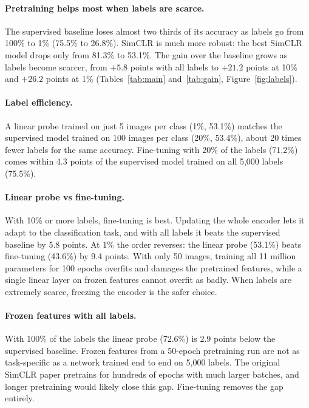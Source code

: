 \documentclass[11pt,a4paper]{article}
\begin{document}
\paragraph{Pretraining helps most when labels are scarce.} The supervised baseline loses almost two thirds of
its accuracy as labels go from 100\% to 1\% (75.5\% to 26.8\%). SimCLR is much more robust: the best SimCLR
model drops only from 81.3\% to 53.1\%. The gain over the baseline grows as labels become scarcer, from $+5.8$
points with all labels to $+21.2$ points at 10\% and $+26.2$ points at 1\% (Tables~\ref{tab:main}
and~\ref{tab:gain}, Figure~\ref{fig:labels}).

\paragraph{Label efficiency.} A linear probe trained on just 5 images per class (1\%, 53.1\%) matches the
supervised model trained on 100 images per class (20\%, 53.4\%), about 20 times fewer labels for the same
accuracy. Fine-tuning with 20\% of the labels (71.2\%) comes within 4.3 points of the supervised model trained
on all 5,000 labels (75.5\%).

\paragraph{Linear probe vs fine-tuning.} With 10\% or more labels, fine-tuning is best. Updating the whole
encoder lets it adapt to the classification task, and with all labels it beats the supervised baseline by 5.8
points. At 1\% the order reverses: the linear probe (53.1\%) beats fine-tuning (43.6\%) by 9.4 points. With
only 50 images, training all 11 million parameters for 100 epochs overfits and damages the pretrained
features, while a single linear layer on frozen features cannot overfit as badly. When labels are extremely
scarce, freezing the encoder is the safer choice.

\paragraph{Frozen features with all labels.} With 100\% of the labels the linear probe (72.6\%) is 2.9 points
below the supervised baseline. Frozen features from a 50-epoch pretraining run are not as task-specific as a
network trained end to end on 5,000 labels. The original SimCLR paper pretrains for hundreds of epochs with
much larger batches, and longer pretraining would likely close this gap. Fine-tuning removes the gap entirely.
\end{document}
